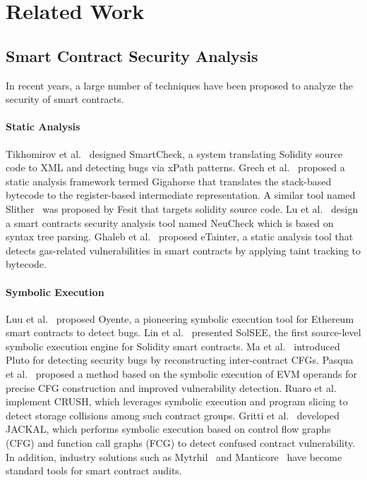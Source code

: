 \section{Related Work}
\subsection{Smart Contract Security Analysis}
In recent years, a large number of techniques have been proposed to analyze the security of smart contracts.

\paragraph{Static Analysis}
Tikhomirov et al.~\cite{tikhomirov2018smartcheck} designed SmartCheck, a system translating
Solidity source code to XML and detecting bugs via xPath patterns. Grech et
al.~\cite{grech2022elipmoc} proposed a static analysis framework termed Gigahorse that translates
the stack-based bytecode to the register-based intermediate representation. A similar tool named
Slither~\cite{Slither} was proposed by Fesit that targets solidity source code. Lu et
al.~\cite{lu2021neucheck} design a smart contracts security analysis tool named NeuCheck which is
based on syntax tree parsing. Ghaleb et al.~\cite{ghaleb2022etainter} proposed eTainter, a static analysis tool that detects gas-related vulnerabilities in smart contracts by applying taint tracking to bytecode.

\paragraph{Symbolic Execution}
Luu et al.~\cite{luu2016making} proposed Oyente, a pioneering symbolic execution tool for Ethereum smart contracts to detect bugs. Lin et al.~\cite{lin2022solsee} presented SolSEE, the first source-level symbolic execution engine for Solidity smart contracts. Ma et al.~\cite{ma2021pluto} introduced Pluto for detecting security bugs by reconstructing inter-contract CFGs. Pasqua et al.~\cite{pasqua2023enhancing} proposed a method based on the symbolic execution of EVM operands for precise CFG construction and improved vulnerability detection. Ruaro et al.~\cite{ruaro2024not} implement CRUSH, which leverages symbolic execution and program slicing to detect storage collisions among such contract groups. Gritti et al.~\cite{gritti2023confusum} developed JACKAL, which performs symbolic execution based on control flow graphs (CFG) and function call graphs (FCG) to detect confused contract vulnerability. In addition, industry solutions such as Mytrhil~\cite{mythril} and Manticore~\cite{mossberg2019manticore} have become standard tools for smart contract audits.

